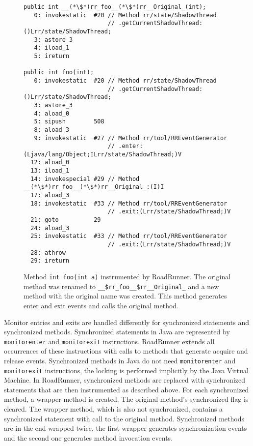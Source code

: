 \begin{figure}[hbt]
    \label{rrInstMethod}
    \begin{lstlisting}
public int __(*\$*)rr_foo__(*\$*)rr__Original_(int);
   0: invokestatic  #20 // Method rr/state/ShadowThread
                        // .getCurrentShadowThread:()Lrr/state/ShadowThread;
   3: astore_3
   4: iload_1
   5: ireturn

public int foo(int);
   0: invokestatic  #20 // Method rr/state/ShadowThread
                        // .getCurrentShadowThread:()Lrr/state/ShadowThread;
   3: astore_3
   4: aload_0
   5: sipush        508
   8: aload_3
   9: invokestatic  #27 // Method rr/tool/RREventGenerator
                        // .enter:(Ljava/lang/Object;ILrr/state/ShadowThread;)V
  12: aload_0
  13: iload_1
  14: invokespecial #29 // Method __(*\$*)rr_foo__(*\$*)rr__Original_:(I)I
  17: aload_3
  18: invokestatic  #33 // Method rr/tool/RREventGenerator
                        // .exit:(Lrr/state/ShadowThread;)V
  21: goto          29
  24: aload_3
  25: invokestatic  #33 // Method rr/tool/RREventGenerator
                        // .exit:(Lrr/state/ShadowThread;)V
  28: athrow
  29: ireturn\end{lstlisting}
    \caption{Method \texttt{int foo(int a)} instrumented by RoadRunner. The
    original method was renamed to \texttt{\_\_\$rr\_foo\_\_\$rr\_\_Original\_}
    and a new method with the original name was created. This method generates
    enter and exit events and calls the original method.}
\end{figure}

Monitor entries and exits are handled differently for synchronized statements
and synchronized methods. Synchronized statements in Java are represented by
\texttt{monitorenter} and \texttt{monitorexit} instructions. RoadRunner extends 
all occurrences of these instructions with calls to methods that generate
acquire and release events. Synchronized methods in Java do not need
\texttt{monitorenter} and \texttt{monitorexit} instructions, the locking is
performed implicitly by the Java Virtual Machine. In RoadRunner, synchronized
methods are replaced with synchronized statements that are then instrumented as
described above. For each synchronized method, a wrapper method is created. The
original method's synchronized flag is cleared. The wrapper method, which is
also not synchronized, contains a synchronized statement with call to the
original method. Synchronized methods are in the end wrapped twice, the first
wrapper generates synchronization events and the second one generates method
invocation events.

